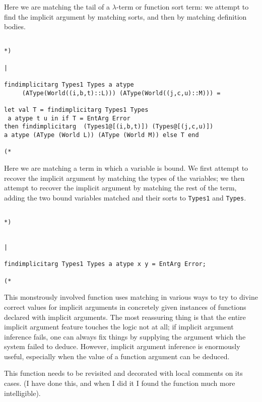 \documentclass{article}
\begin{document}
Here we are matching the tail of a $\lambda$-term or function sort term:  we attempt to find the implicit argument by matching sorts,
and then by matching definition bodies.

\begin{verbatim}

*)

|

findimplicitarg Types1 Types a atype 
     (AType(World((i,b,t)::L))) (AType(World((j,c,u)::M))) =

let val T = findimplicitarg Types1 Types
 a atype t u in if T = EntArg Error 
then findimplicitarg  (Types1@[(i,b,t)]) (Types@[(j,c,u)]) 
a atype (AType (World L)) (AType (World M)) else T end

(*

\end{verbatim}

Here we are matching a term in which a variable is bound.  We first attempt to recover the implicit argument
by matching the types of the variables;  we then attempt to recover the implicit argument by matching the
rest of the term, adding the two bound variables matched and their sorts to {\tt Types1} and {\tt Types}.

\begin{verbatim}

*)


|

findimplicitarg Types1 Types a atype x y = EntArg Error;

(*

\end{verbatim}

This monstrously involved function uses matching in various ways to try to divine correct values for implicit arguments in concretely given instances of functions declared with implicit arguments.  The most reassuring thing is that the entire implicit argument feature touches the logic not at all;  if implicit argument inference fails, one can always fix things by supplying the argument which the system failed to deduce.  However, implicit argument inference is enormously useful, especially when the value of a function argument can be deduced.

This function needs to be revisited and decorated with local comments on its cases.  (I have done this, and when I did it I found the function much more intelligible).
\end{document}
